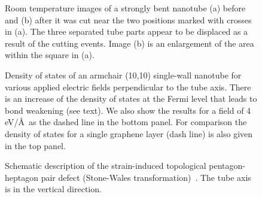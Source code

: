 \begin{multicols}{2}
\begin{figure}
\caption[]{Room temperature images of a strongly bent nanotube (a) before and (b) after it was cut near the two positions marked with crosses in (a). The three separated tube parts appear to be displaced as a result of the cutting events. Image (b) is an enlargement of the area within the square in (a).}
\end{figure}

\begin{figure}
\caption[]{Density of states of an armchair (10,10) single-wall nanotube for various applied electric fields perpendicular to the tube axis. There is an increase of the density of states at the Fermi level that leads to bond weakening (see text). We also show the results for a field of 4 eV/\AA\ as the dashed line in the bottom panel. For comparison the density of states for a single graphene layer (dash line) is also given in the top panel.}
\end{figure}

\begin{figure}
\caption[]{Schematic description of the strain-induced topological pentagon-heptagon pair defect (Stone-Wales transformation)~\cite{SW}. The tube axis is in the vertical direction. }
\end{figure}

\end{multicols}

